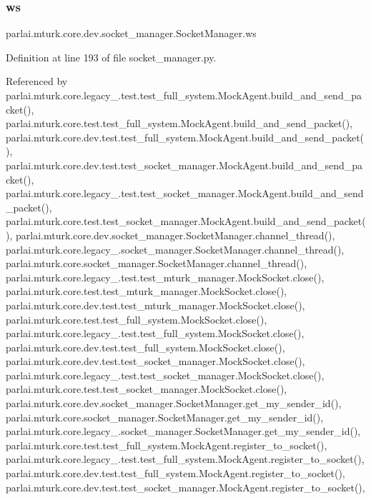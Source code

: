 \subsubsection{\texorpdfstring{ws}{ws}}
{\footnotesize\ttfamily parlai.\+mturk.\+core.\+dev.\+socket\+\_\+manager.\+Socket\+Manager.\+ws}



Definition at line 193 of file socket\+\_\+manager.\+py.



Referenced by parlai.\+mturk.\+core.\+legacy\+\_.\+test.\+test\+\_\+full\+\_\+system.\+Mock\+Agent.\+build\+\_\+and\+\_\+send\+\_\+packet(), parlai.\+mturk.\+core.\+test.\+test\+\_\+full\+\_\+system.\+Mock\+Agent.\+build\+\_\+and\+\_\+send\+\_\+packet(), parlai.\+mturk.\+core.\+dev.\+test.\+test\+\_\+full\+\_\+system.\+Mock\+Agent.\+build\+\_\+and\+\_\+send\+\_\+packet(), parlai.\+mturk.\+core.\+dev.\+test.\+test\+\_\+socket\+\_\+manager.\+Mock\+Agent.\+build\+\_\+and\+\_\+send\+\_\+packet(), parlai.\+mturk.\+core.\+legacy\+\_.\+test.\+test\+\_\+socket\+\_\+manager.\+Mock\+Agent.\+build\+\_\+and\+\_\+send\+\_\+packet(), parlai.\+mturk.\+core.\+test.\+test\+\_\+socket\+\_\+manager.\+Mock\+Agent.\+build\+\_\+and\+\_\+send\+\_\+packet(), parlai.\+mturk.\+core.\+dev.\+socket\+\_\+manager.\+Socket\+Manager.\+channel\+\_\+thread(), parlai.\+mturk.\+core.\+legacy\+\_.\+socket\+\_\+manager.\+Socket\+Manager.\+channel\+\_\+thread(), parlai.\+mturk.\+core.\+socket\+\_\+manager.\+Socket\+Manager.\+channel\+\_\+thread(), parlai.\+mturk.\+core.\+legacy\+\_.\+test.\+test\+\_\+mturk\+\_\+manager.\+Mock\+Socket.\+close(), parlai.\+mturk.\+core.\+test.\+test\+\_\+mturk\+\_\+manager.\+Mock\+Socket.\+close(), parlai.\+mturk.\+core.\+dev.\+test.\+test\+\_\+mturk\+\_\+manager.\+Mock\+Socket.\+close(), parlai.\+mturk.\+core.\+test.\+test\+\_\+full\+\_\+system.\+Mock\+Socket.\+close(), parlai.\+mturk.\+core.\+legacy\+\_.\+test.\+test\+\_\+full\+\_\+system.\+Mock\+Socket.\+close(), parlai.\+mturk.\+core.\+dev.\+test.\+test\+\_\+full\+\_\+system.\+Mock\+Socket.\+close(), parlai.\+mturk.\+core.\+dev.\+test.\+test\+\_\+socket\+\_\+manager.\+Mock\+Socket.\+close(), parlai.\+mturk.\+core.\+legacy\+\_.\+test.\+test\+\_\+socket\+\_\+manager.\+Mock\+Socket.\+close(), parlai.\+mturk.\+core.\+test.\+test\+\_\+socket\+\_\+manager.\+Mock\+Socket.\+close(), parlai.\+mturk.\+core.\+dev.\+socket\+\_\+manager.\+Socket\+Manager.\+get\+\_\+my\+\_\+sender\+\_\+id(), parlai.\+mturk.\+core.\+socket\+\_\+manager.\+Socket\+Manager.\+get\+\_\+my\+\_\+sender\+\_\+id(), parlai.\+mturk.\+core.\+legacy\+\_.\+socket\+\_\+manager.\+Socket\+Manager.\+get\+\_\+my\+\_\+sender\+\_\+id(), parlai.\+mturk.\+core.\+test.\+test\+\_\+full\+\_\+system.\+Mock\+Agent.\+register\+\_\+to\+\_\+socket(), parlai.\+mturk.\+core.\+legacy\+\_.\+test.\+test\+\_\+full\+\_\+system.\+Mock\+Agent.\+register\+\_\+to\+\_\+socket(), parlai.\+mturk.\+core.\+dev.\+test.\+test\+\_\+full\+\_\+system.\+Mock\+Agent.\+register\+\_\+to\+\_\+socket(), parlai.\+mturk.\+core.\+dev.\+test.\+test\+\_\+socket\+\_\+manager.\+Mock\+Agent.\+register\+\_\+to\+\_\+socket(), 